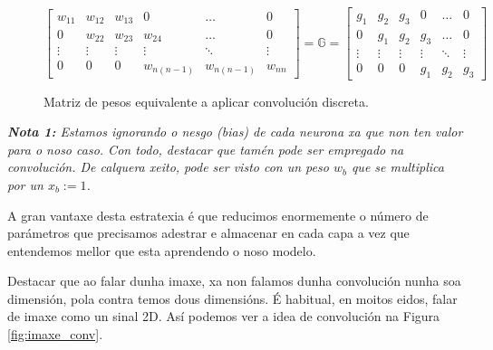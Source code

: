 \documentclass{article}
\begin{document}
\begin{figure}[h]
    \centering
    \begin{equation}
    \begin{bmatrix}
    w_{11} & w_{12} & w_{13} & 0 &\ldots & 0 \\
    0 & w_{22} & w_{23} & w_{24} &\ldots & 0 \\
    \vdots & \vdots & \vdots & \vdots & \ddots & \vdots\\
    0 & 0 & 0 & w_{n(n-1)} & w_{n(n-1)} & w_{nn}
    \end{bmatrix} 
    = 
    \mathbb{G}
    =
    \begin{bmatrix}
    g_{1} & g_{2} & g_{3} & 0 &\ldots & 0 \\
    0 & g_{1} & g_{2} & g_{3} &\ldots & 0 \\
    \vdots & \vdots & \vdots & \vdots & \ddots & \vdots\\
    0 & 0 & 0 & g_{1} & g_{2} & g_{3}
    \end{bmatrix} 
    \end{equation}
    \caption{Matriz de pesos equivalente a aplicar convolución discreta.}
    \label{mat_pesosrestriccions}
\end{figure}



\textit{\textbf{Nota 1:} Estamos ignorando o nesgo (bias) de cada neurona xa que non ten valor para o noso caso. Con todo, destacar que tamén pode ser empregado na convolución. De calquera xeito, pode ser visto con un peso $w_b$ que se multiplica por un $x_b := 1$.}

A gran vantaxe desta estratexia é que reducimos enormemente o número de parámetros que precisamos adestrar e almacenar en cada capa a vez que entendemos mellor que esta aprendendo o noso modelo. 

Destacar que ao falar dunha imaxe, xa non falamos dunha convolución nunha soa dimensión, pola contra temos dous dimensións. É habitual, en moitos eidos, falar de imaxe como un sinal 2D. Así podemos ver a idea de convolución na Figura \ref{fig:imaxe_conv}.
\end{document}
